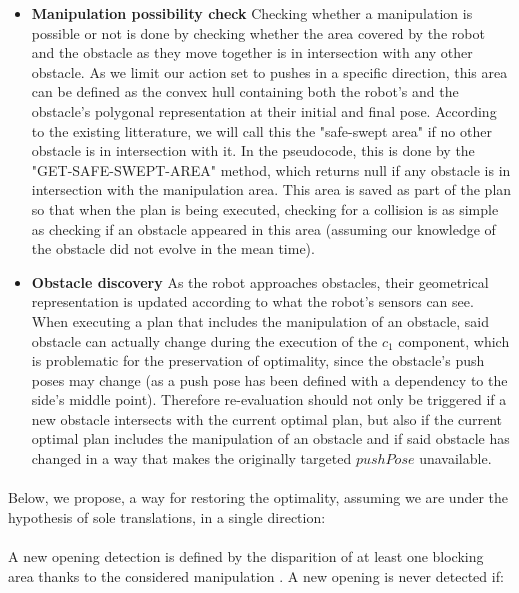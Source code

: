 \begin{itemize}
  \item \textbf{Manipulation possibility check} Checking whether a manipulation is possible or not is done by checking whether the area covered by the robot and the obstacle as they move together is in intersection with any other obstacle. As we limit our action set to pushes in a specific direction, this area can be defined as the convex hull containing both the robot's and the obstacle's polygonal representation at their initial and final pose. According to the existing litterature, we will call this the "safe-swept area" if no other obstacle is in intersection with it. In the pseudocode, this is done by the "GET-SAFE-SWEPT-AREA" method, which returns null if any obstacle is in intersection with the manipulation area. This area is saved as part of the plan so that when the plan is being executed, checking for a collision is as simple as checking if an obstacle appeared in this area (assuming our knowledge of the obstacle did not evolve in the mean time).
  \item \textbf{Obstacle discovery} As the robot approaches obstacles, their geometrical representation is updated according to what the robot's sensors can see. When executing a plan that includes the manipulation of an obstacle, said obstacle can actually change during the execution of the $c_{1}$ component, which is problematic for the preservation of optimality, since the obstacle's push poses may change (as a push pose has been defined with a dependency to the side's middle point). Therefore re-evaluation should not only be triggered if a new obstacle intersects with the current optimal plan, but also if the current optimal plan includes the manipulation of an obstacle and if said obstacle has changed in a way that makes the originally targeted $pushPose$ unavailable.
\end{itemize}

\paragraph{}\label{check_opening_solution} Below, we propose, a way for restoring the optimality, assuming we are under the hypothesis of sole translations, in a single direction:

\paragraph{} A new opening detection is defined by the disparition of at least one blocking area thanks to the considered manipulation \parencite{levihn_efficient_2011}. A new opening is never detected if:

